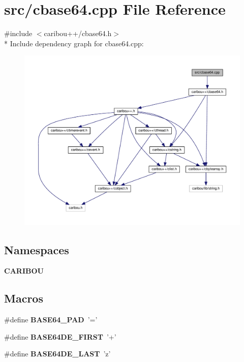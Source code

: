 \section{src/cbase64.cpp File Reference}
\label{cbase64_8cpp}
{\ttfamily \#include $<$caribou++/cbase64.\-h$>$}\\*
Include dependency graph for cbase64.\-cpp\-:\nopagebreak
\begin{figure}[H]
\begin{center}
\leavevmode
\includegraphics[width=350pt]{cbase64_8cpp__incl}
\end{center}
\end{figure}
\subsection*{Namespaces}
\begin{DoxyCompactItemize}
\item 
{\bf C\-A\-R\-I\-B\-O\-U}
\end{DoxyCompactItemize}
\subsection*{Macros}
\begin{DoxyCompactItemize}
\item 
\#define {\bf B\-A\-S\-E64\-\_\-\-P\-A\-D}~'='
\item 
\#define {\bf B\-A\-S\-E64\-D\-E\-\_\-\-F\-I\-R\-S\-T}~'+'
\item 
\#define {\bf B\-A\-S\-E64\-D\-E\-\_\-\-L\-A\-S\-T}~'z'
\end{DoxyCompactItemize}


